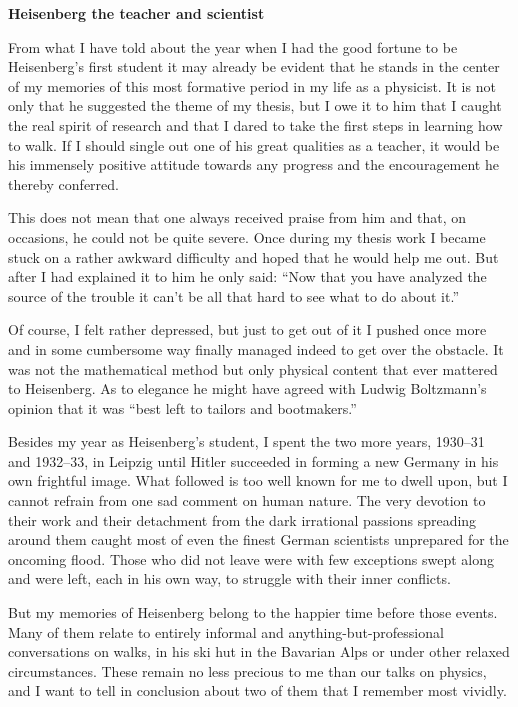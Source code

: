 \documentclass[12pt]{article}
\begin{document}
\bigskip
\noindent
{\bf Heisenberg the teacher and scientist}

\smallskip
From what I have told about the year when I had the good fortune to be Heisenberg's first student it may already be evident that he stands in the center of my memories of this most formative period in my life as a physicist. It is not only that he suggested the theme of my thesis, but I owe it to him that I caught the real spirit of research and that I dared to take the first steps in learning how to walk. If I should single out one of his great qualities as a teacher, it would be his immensely positive attitude towards any progress and the encouragement he thereby conferred.

This does not mean that one always received praise from him and that, on occasions, he could not be quite severe. Once during my thesis work I became stuck on a rather awkward difficulty and hoped that he would help me out. But
after I had explained it to him he only said: ``Now that you have analyzed the source of the trouble it can't be all that hard to see what to do about it.''

Of course, I felt rather depressed, but just to get out of it I pushed once more and in some cumbersome way finally managed indeed to get over the obstacle. It was not the mathematical method but only physical content that ever mattered to Heisenberg. As to elegance he might have agreed with Ludwig Boltzmann's opinion that it was ``best left to tailors and bootmakers.''

Besides my year as Heisenberg's student, I spent the two more years, 1930--31 and 1932--33, in Leipzig until Hitler succeeded in forming a new Germany in his own frightful image. What followed is too well known for me to dwell upon, but I cannot refrain from one sad comment on human nature. The very devotion to their work and their detachment from the dark irrational passions spreading around them caught most of even the finest German scientists unprepared for the oncoming flood. Those who did not leave were with few exceptions swept along and
were left, each in his own way, to struggle with their inner conflicts.

But my memories of Heisenberg belong to the happier time before those events. Many of them relate to entirely informal and anything-but-professional conversations on walks, in his ski hut in the Bavarian Alps or under other relaxed circumstances. These remain no less precious to me than our talks on physics, and I want to tell in conclusion about two of them that I remember most vividly.
\end{document}
